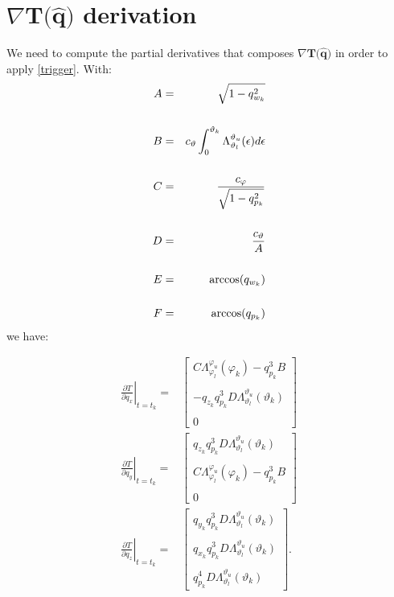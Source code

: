 \documentclass{article}
\begin{document}

\appendix
	\section{$\nabla \mathbf{T(\hat{q}})$ derivation}
		We need to compute the partial derivatives that composes $\nabla \mathbf{T(\hat{q}})$ in order to apply \eqref{trigger}. With:
		\begin{eqnarray*}
			A &=& \sqrt{1-q_{w_k}^2}\\\\
			B &=& c_\vartheta \displaystyle \int_0^{\vartheta_k}{\Lambda_{\vartheta_l}^{\vartheta_u}(\epsilon)} d\epsilon\\\\
			C &=& \displaystyle \displaystyle \frac{c_\varphi}{\sqrt{1-q_{p_k}^2}}\\\\
			D &=& \displaystyle \displaystyle \frac{c_\vartheta}{A}\\\\
			E &=& \arccos(q_{w_k}) \\\\
			F &=& \arccos(q_{p_k})
		\end{eqnarray*}
		we have:
		
		\begin{eqnarray*}
				\left .\displaystyle \frac{\partial T}{\partial q_x}\right |_{t=t_k}  =& \begin{bmatrix}
												C \Lambda_{\varphi_l}^{\varphi_u}(\varphi_k) - q_{p_k}^3 B \\\\
												-q_{z_k} q_{p_k}^3 D \Lambda_{\vartheta_l}^{\vartheta_u}(\vartheta_k)\\\\
												0
											   \end{bmatrix}
											   \\
				\left .\displaystyle \frac{\partial T}{\partial q_y}\right |_{t=t_k}  =& \begin{bmatrix}
												q_{z_k} q_{p_k}^3 D \Lambda_{\vartheta_l}^{\vartheta_u}(\vartheta_k) \\\\
												C \Lambda_{\varphi_l}^{\varphi_u}(\varphi_k) - q_{p_k}^3 B\\\\
												0
											   \end{bmatrix}
											   \\
				\left .\displaystyle \frac{\partial T}{\partial q_z}\right |_{t=t_k}  =& \begin{bmatrix}
												q_{y_k} q_{p_k}^3 D \Lambda_{\vartheta_l}^{\vartheta_u}(\vartheta_k)\\\\
												q_{x_k} q_{p_k}^3 D \Lambda_{\vartheta_l}^{\vartheta_u}(\vartheta_k)\\\\
												q_{p_k}^4 D \Lambda_{\vartheta_l}^{\vartheta_u}(\vartheta_k)
											   \end{bmatrix}.
		\end{eqnarray*}
		
\end{document}
